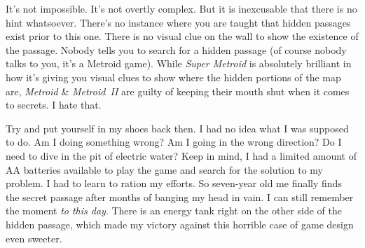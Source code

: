 \documentclass{book}
\begin{document}
\begin{minipage}{0.45\linewidth}\end{minipage}\vspace{2pt}
\begin{minipage}{0.45\linewidth}\end{minipage}\vspace{2pt}
\begin{minipage}{0.45\linewidth}\end{minipage}\vspace{2pt}
\begin{minipage}{0.45\linewidth}\end{minipage}\vspace{2pt}
\begin{minipage}{0.45\linewidth}\end{minipage}
\par\justifying
It’s not impossible. It’s not overtly complex. But it is inexcusable that there is no hint whatsoever. There’s no instance where you are taught that hidden passages exist prior to this one. There is no visual clue on the wall to show the existence of the passage. Nobody tells you to search for a hidden passage (of course nobody talks to you, it’s a Metroid game). While \emph{Super Metroid} is absolutely brilliant in how it’s giving you visual clues to show where the hidden portions of the map are, \emph{Metroid} \& \emph{Metroid~II} are guilty of keeping their mouth shut when it comes to secrets. I hate that.\par
Try and put yourself in my shoes back then. I had no idea what I was supposed to do. Am I doing something wrong? Am I going in the wrong direction? Do I need to dive in the pit of electric water? Keep in mind, I had a limited amount of AA batteries available to play the game and search for the solution to my problem. I had to learn to ration my efforts. So seven-year old me finally finds the secret passage after months of banging my head in vain. I can still remember the moment \emph{to this day}. There is an energy tank right on the other side of the hidden passage, which made my victory against this horrible case of game design even sweeter.\par
\end{document}
